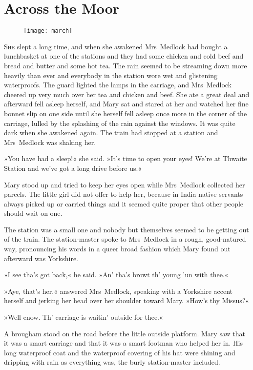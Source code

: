 \chapter{Across the Moor} 
	
\begin{figure}[t!]
\centering
\texttt{[image: march]}
\end{figure}

 \lettrine[lines=6]{S}{he} slept a long time, and when she awakened Mrs~Medlock had bought a lunchbasket at one of the stations and they had some chicken and cold beef and bread and butter and some hot tea. The rain seemed to be streaming down more heavily than ever and everybody in the station wore wet and glistening waterproofs. The guard lighted the lamps in the carriage, and Mrs~Medlock cheered up very much over her tea and chicken and beef. She ate a great deal and afterward fell asleep herself, and Mary sat and stared at her and watched her fine bonnet slip on one side until she herself fell asleep once more in the corner of the carriage, lulled by the splashing of the rain against the windows. It was quite dark when she awakened again. The train had stopped at a station and Mrs~Medlock was shaking her.

»You have had a sleep!« she said. »It's time to open your eyes! We're at Thwaite Station and we've got a long drive before us.«

Mary stood up and tried to keep her eyes open while Mrs~Medlock collected her parcels. The little girl did not offer to help her, because in India native servants always picked up or carried things and it seemed quite proper that other people should wait on one.

The station was a small one and nobody but themselves seemed to be getting out of the train. The station-master spoke to Mrs~Medlock in a rough, good-natured way, pronouncing his words in a queer broad fashion which Mary found out afterward was Yorkshire.

»I see tha's got back,« he said. »An' tha's browt th' young 'un with thee.«

»Aye, that's her,« answered Mrs~Medlock, speaking with a Yorkshire accent herself and jerking her head over her shoulder toward Mary. »How's thy Missus?«

»Well enow. Th' carriage is waitin' outside for thee.«

A brougham stood on the road before the little outside platform. Mary saw that it was a smart carriage and that it was a smart footman who helped her in. His long waterproof coat and the waterproof covering of his hat were shining and dripping with rain as everything was, the burly station-master included.

